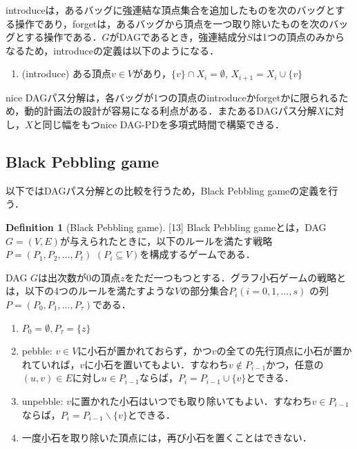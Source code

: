 \documentclass[master]{kuisthesis}		%
\theoremstyle{plain}
\theoremstyle{definition}
\newtheorem{definition*}{Definition}
\begin{document}
introduceは，あるバッグに強連結な頂点集合を追加したものを次のバッグとする操作であり，forgetは，あるバッグから頂点を一つ取り除いたものを次のバッグとする操作である．$G$がDAGであるとき，強連結成分$S$は1つの頂点のみからなるため，introduceの定義は以下のようになる．

\begin{enumerate}
    \item (introduce) ある頂点$v \in V$があり，$\{v\} \cap X_i = \emptyset$, $X_{i+1} = X_i \cup \{v\}$
\end{enumerate}

nice DAGパス分解は，各バッグが1つの頂点のintroduceかforgetかに限られるため，動的計画法の設計が容易になる利点がある．またあるDAGパス分解$X$に対し，$X$と同じ幅をもつnice DAG-PDを多項式時間で構築できる．














\subsection{Black Pebbling game} %
以下ではDAGパス分解との比較を行うため，Black Pebbling gameの定義を行う．

\begin{definition*}[Black Pebbling game][13]
    Black Pebbling gameとは，DAG $G = (V, E)$が与えられたときに，以下のルールを満たす戦略$P=(P_1, P_2, \dots, P_t)$ $(P_i \subseteq V)$を構成するゲームである．


    DAG $G$は出次数が0の頂点$z$をただ一つもつとする．グラフ小石ゲームの戦略とは，以下の4つのルールを満たすような$V$の部分集合$ P_i (i = 0, 1,   \dots, s)$ の列 $P = (P_0, P_1,   \dots, P_{\tau})$である．

    \begin{enumerate}
        \item $P_0 = \emptyset, P_{\tau} = \{ z \}$
        \item pebble: $v \in V$に小石が置かれておらず，かつ$v$の全ての先行頂点に小石が置かれていれば，$v$に小石を置いてもよい．すなわち$v \notin P_{i-1}$かつ，任意の$(u, v) \in E$に対し$u \in P_{i-1}$ならば，$P_i = P_{i-1} \cup \{v\}$とできる．
        \item unpebble: $v$に置かれた小石はいつでも取り除いてもよい．すなわち$v \in P_{i-1}$ならば，$P_i = P_{i-1} \backslash \{v\}$とできる．
        \item 一度小石を取り除いた頂点には，再び小石を置くことはできない．
    \end{enumerate}
\end{definition*}
\end{document}

